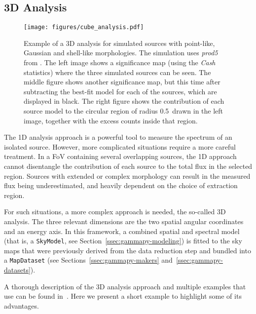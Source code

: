 \documentclass[longauth]{aa}
\newcommand{\code}[1]{\texttt{#1}}
\begin{document}
\subsection{3D Analysis}
\label{ssec:3d-analysis}
%
\begin{figure*}[t]
	\centering
	\texttt{[image: figures/cube\_analysis.pdf]}
	\caption{Example of a 3D analysis for simulated sources with point-like, Gaussian
		and shell-like morphologies. The simulation uses \textit{prod5} \irfs from \cta.
		The left image shows a significance map (using the \emph{Cash} statistics)
		where the three simulated sources can be seen. The middle figure shows another significance map,
		but this time after
		subtracting the best-fit model for each of the sources, which are displayed in
		black. The right figure shows the contribution of each source model to the
		circular region of radius 0.5\textdegree~drawn in the left image, together with
		the excess counts inside that region. }
	\label{fig:cube_analysis}
\end{figure*}
%
The 1D analysis approach is a powerful tool to measure the spectrum of an
isolated source. However, more complicated situations require a more careful
treatment. In a FoV containing several overlapping sources, the 1D
approach cannot disentangle the contribution of each source to the total flux in
the selected region. Sources with extended or complex morphology can result in
the measured flux being underestimated, and heavily dependent on the choice of
extraction region.

For such situations, a more complex approach is needed, the so-called 3D
analysis. The three relevant dimensions are the two spatial angular coordinates
and an energy axis. In this framework, a combined spatial and spectral model
(that is, a \code{SkyModel}, see Section~\ref{ssec:gammapy-modeling}) is fitted to the
sky maps that were previously derived from the data reduction step and bundled into a
\code{MapDataset} (see Sections~\ref{ssec:gammapy-makers} and~\ref{ssec:gammapy-datasets}).

A thorough description of the 3D analysis approach and multiple examples that
use \gammapy can be found in~\cite{Mohrmann2019}. Here we present a short
example to highlight some of its advantages.
\end{document}
